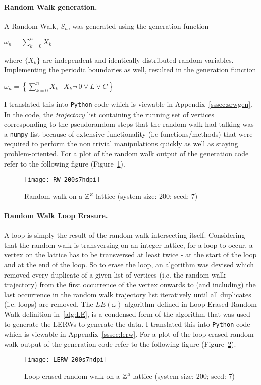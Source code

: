 \documentclass{article}
\newcommand\given[1][]{\:#1\vert\:}
\begin{document}
\paragraph{Random Walk generation.} A Random Walk, $S_{n}$, was generated using the generation function
	\begin{center}
		$\omega_{n} =  \sum_{k=0}^n X_k$
	\end{center}
where $\{X_k\}$ are independent and identically distributed random variables. 
Implementing the periodic boundaries as well, resulted in the generation function 
\begin{center}
		$\omega_{n} =  \left\{ \sum_{k=0}^n X_k \given[\Big] X_k \lnot\ 0 \lor L \lor C \right\}$
\end{center}
I translated this into \texttt{Python} code which is viewable in Appendix~\ref{sssec:srwgen}. In the code, the \emph{trajectory} list containing the running set of vertices corresponding to the pseudorandom steps that the random walk had talking was a \texttt{numpy} list because of extensive functionality (i.e functions/methods) that were required to perform the non trivial manipulations quickly as well as staying problem-oriented. For a plot of the random walk output of the generation code refer to the following figure (Figure~\ref{fig:RW}).
\begin{figure}[h!]
	\begin{center}
		\texttt{[image: RW\_200s7hdpi]}
		\caption{Random walk on a $\mathbb{Z}^{\emph{2}}$ lattice (system size: 200; seed: 7)}
		\label{fig:RW}
	\end{center}
\end{figure}

\paragraph{Random Walk Loop Erasure.} A loop is simply the result of the random walk intersecting itself. Considering that the random walk is transversing on an integer lattice, for a loop to occur, a vertex on the lattice has to be transversed at least twice - at the start of the loop and at the end of the loop. So to erase the loop, an algorithm was devised which removed every duplicate of a given list of vertices (i.e. the random walk trajectory) from the first occurrence of the vertex onwards to (and including) the last occurrence in the random walk trajectory list iteratively until all duplicates (i.e. loops) are removed. The $LE(\omega)$ algorithm defined in Loop Erased Random Walk definition in~\ref{alg:LE}, is a condensed form of the algorithm that was used to generate the LERWs to generate the data.
I translated this into \texttt{Python} code which is viewable in Appendix~\ref{sssec:lerw}. For a plot of the loop erased random walk output of the generation code refer to the following figure (Figure~\ref{fig:LERW}).
\begin{figure}[h!]
	\begin{center}
		\texttt{[image: LERW\_200s7hdpi]}
		\caption{Loop erased random walk on a $\mathbb{Z}^{\emph{2}}$ lattice (system size: 200; seed: 7)}
		\label{fig:LERW}
	\end{center}
\end{figure}
\newpage
\end{document}
